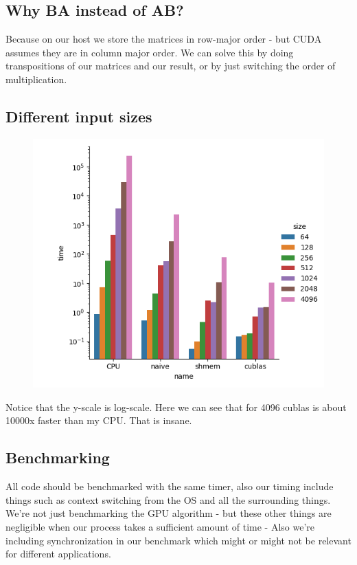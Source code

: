 \documentclass{article}
\begin{document}
\subsection{Why BA instead of AB?}%
\label{sub:why_ba_instead_of_ab_}
Because on our host we store the matrices in row-major order - but CUDA assumes they are in column major order. We can solve this by doing transpositions of our matrices and our result, or by just switching the order of multiplication.

\subsection{Different input sizes}%
\label{sub:different_input_sizes}



\begin{figure}[H]
  \centering
  \includegraphics[width=0.98\linewidth]{ex_3/ex_bonus/simulation-time.png}
  \label{fig:}
\end{figure}

Notice that the y-scale is log-scale. Here we can see that for 4096 cublas is about 10000x faster than my CPU. That is insane.

\subsection{Benchmarking}%
\label{sub:benchmarking}

All code should be benchmarked with the same timer, also our timing include things such as context switching from the OS and all the surrounding things. We're not just benchmarking the GPU algorithm - but these other things
are negligible when our process takes a sufficient amount of time - Also we're including synchronization in our benchmark which might or might not be relevant for different applications.
\end{document}
